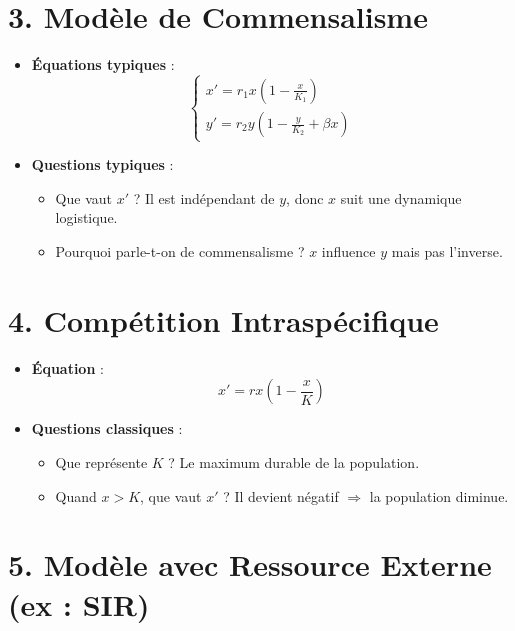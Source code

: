 \documentclass{article}
\begin{document}
\section*{3. Modèle de Commensalisme}

\begin{itemize}
  \item \textbf{Équations typiques} :
  \[
  \begin{cases}
  x' = r_1 x \left(1 - \frac{x}{K_1}\right) \\
  y' = r_2 y \left(1 - \frac{y}{K_2} + \beta x\right)
  \end{cases}
  \]
  \item \textbf{Questions typiques} :
  \begin{itemize}
    \item Que vaut $x'$ ? Il est indépendant de $y$, donc $x$ suit une dynamique logistique.
    \item Pourquoi parle-t-on de commensalisme ? $x$ influence $y$ mais pas l’inverse.
  \end{itemize}
\end{itemize}

\section*{4. Compétition Intraspécifique}

\begin{itemize}
  \item \textbf{Équation} :
  \[
  x' = r x \left(1 - \frac{x}{K}\right)
  \]
  \item \textbf{Questions classiques} :
  \begin{itemize}
    \item Que représente $K$ ? Le maximum durable de la population.
    \item Quand $x > K$, que vaut $x'$ ? Il devient négatif $\Rightarrow$ la population diminue.
  \end{itemize}
\end{itemize}

\section*{5. Modèle avec Ressource Externe (ex : SIR)}
\end{document}
